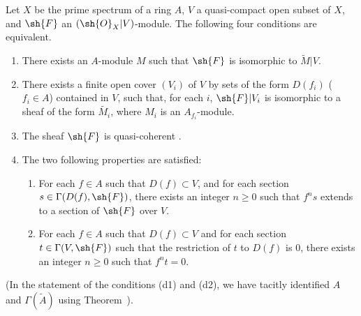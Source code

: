 \begin{theorem}[1.4.1]
\label{I.1.4.1}
Let $X$ be the prime spectrum of a ring $A$, $V$ a quasi-compact open subset of $X$, and $\sh{F}$ an $(\sh{O}_X|V)$-module.
The following four conditions are equivalent.
\begin{enumerate}
  \item[{\rm(a)}] There exists an $A$-module $M$ such that $\sh{F}$ is isomorphic to $\widetilde{M}|V$.
  \item[{\rm(b)}] There exists a finite open cover $(V_i)$ of $V$ by sets of the form $D(f_i)$ ($f_i\in A$) contained in $V$, such that, for each $i$, $\sh{F}|V_i$ is isomorphic to a sheaf of the form $\widetilde{M_i}$, where $M_i$ is an $A_{f_i}$-module.
  \item[{\rm(c)}] The sheaf $\sh{F}$ is quasi-coherent .
  \item[{\rm(d)}] The two following properties are satisfied:
    \begin{enumerate}
      \item[{\rm(d1)}] For each $f\in A$ such that $D(f)\subset V$, and for each section $s\in\Gamma(D(f),\sh{F})$, there exists an integer $n\geq 0$ such that $f^n s$ extends to a section of $\sh{F}$ over $V$.
      \item[{\rm(d2)}] For each $f\in A$ such that $D(f)\subset V$ and for each section $t\in\Gamma(V,\sh{F})$ such that the restriction of $t$ to $D(f)$ is $0$, there exists an integer $n\geq 0$ such that $f^n t=0$.
    \end{enumerate}
\end{enumerate}
\end{theorem}
(In the statement of the conditions (d1) and (d2), we have tacitly identified $A$ and $\Gamma(\widetilde{A})$ using Theorem~).

